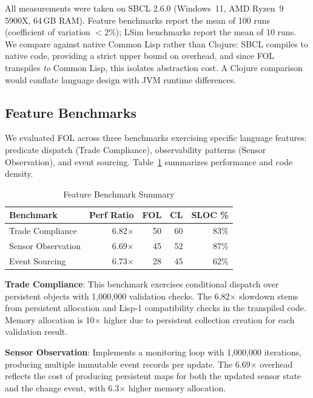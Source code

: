\documentclass[sigconf,nonacm,review]{acmart}
\begin{document}
All measurements were taken on SBCL 2.6.0 (Windows~11, AMD Ryzen~9 5900X, 64\,GB RAM). Feature benchmarks report the mean of 100 runs (coefficient of variation $<$2\%); LSim benchmarks report the mean of 10 runs. We compare against native Common Lisp rather than Clojure: SBCL compiles to native code, providing a strict upper bound on overhead, and since FOL transpiles \textit{to} Common Lisp, this isolates abstraction cost. A Clojure comparison would conflate language design with JVM runtime differences.

\subsection{Feature Benchmarks}

We evaluated FOL across three benchmarks exercising specific language features: predicate dispatch (Trade Compliance), observability patterns (Sensor Observation), and event sourcing. Table~\ref{tab:feature-bench} summarizes performance and code density.

\begin{table}[htbp]
\small
\caption{Feature Benchmark Summary}
\label{tab:feature-bench}
\begin{tabular}{lrrrr}
\toprule
\textbf{Benchmark} & \textbf{Perf Ratio} & \textbf{FOL} & \textbf{CL} & \textbf{SLOC \%} \\
\midrule
Trade Compliance & 6.82$\times$ & 50 & 60 & 83\% \\
Sensor Observation & 6.69$\times$ & 45 & 52 & 87\% \\
Event Sourcing & 6.73$\times$ & 28 & 45 & 62\% \\
\bottomrule
\end{tabular}
\end{table}

\textbf{Trade Compliance}: This benchmark exercises conditional dispatch over persistent objects with 1,000,000 validation checks. The 6.82$\times$ slowdown stems from persistent allocation and Lisp-1 compatibility checks in the transpiled code. Memory allocation is 10$\times$ higher due to persistent collection creation for each validation result.

\textbf{Sensor Observation}: Implements a monitoring loop with 1,000,000 iterations, producing multiple immutable event records per update. The 6.69$\times$ overhead reflects the cost of producing persistent maps for both the updated sensor state and the change event, with 6.3$\times$ higher memory allocation.
\end{document}
